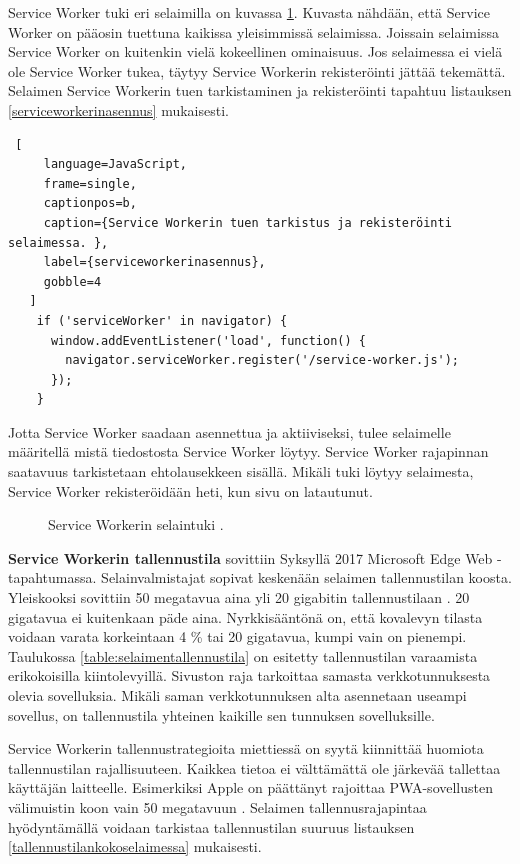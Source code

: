 \documentclass{tktltiki}
\begin{document}
Service Worker tuki eri selaimilla on kuvassa \ref{Service workerin selaintuki}. Kuvasta nähdään, että Service Worker on pääosin tuettuna kaikissa yleisimmissä selaimissa. Joissain selaimissa Service Worker on kuitenkin vielä kokeellinen ominaisuus. Jos selaimessa ei vielä ole Service Worker tukea, täytyy Service Workerin rekisteröinti jättää tekemättä. Selaimen Service Workerin tuen tarkistaminen ja rekisteröinti tapahtuu listauksen \ref{serviceworkerinasennus} mukaisesti.

\begin{lstlisting} [
     language=JavaScript,
     frame=single,
     captionpos=b,
     caption={Service Workerin tuen tarkistus ja rekisteröinti selaimessa. },
     label={serviceworkerinasennus},
     gobble=4
   ]
    if ('serviceWorker' in navigator) {
      window.addEventListener('load', function() {
        navigator.serviceWorker.register('/service-worker.js');
      });
    }
\end{lstlisting}

Jotta Service Worker saadaan asennettua ja aktiiviseksi, tulee selaimelle määritellä mistä tiedostosta Service Worker löytyy. Service Worker rajapinnan saatavuus tarkistetaan ehtolausekkeen sisällä. Mikäli tuki löytyy selaimesta, Service Worker rekisteröidään heti, kun sivu on latautunut. 

\begin{figure}[h]
\begin{center}
\caption{Service Workerin selaintuki \cite{caniuseServiceWorker}. }
\label{Service workerin selaintuki}
\end{center}
\end{figure}


\textbf{Service Workerin tallennustila} sovittiin Syksyllä 2017 Microsoft Edge Web -tapahtumassa. Selainvalmistajat sopivat keskenään selaimen tallennustilan koosta. Yleiskooksi sovittiin 50 megatavua aina yli 20 gigabitin tallennustilaan \cite{Love}. 20 gigatavua ei kuitenkaan päde aina. Nyrkkisääntönä on, että kovalevyn tilasta voidaan varata korkeintaan 4 \% tai 20 gigatavua, kumpi vain on pienempi. Taulukossa \ref{table:selaimentallennustila} on esitetty tallennustilan varaamista erikokoisilla kiintolevyillä. Sivuston raja tarkoittaa samasta verkkotunnuksesta olevia sovelluksia. Mikäli saman verkkotunnuksen alta asennetaan useampi sovellus, on tallennustila yhteinen kaikille sen tunnuksen sovelluksille. 

Service Workerin tallennustrategioita miettiessä on syytä kiinnittää huomiota tallennustilan rajallisuuteen. Kaikkea tietoa ei välttämättä ole järkevää tallettaa käyttäjän laitteelle. Esimerkiksi Apple on päättänyt rajoittaa PWA-sovellusten välimuistin koon vain 50 megatavuun \cite{Love}. Selaimen tallennusrajapintaa hyödyntämällä voidaan tarkistaa tallennustilan suuruus listauksen \ref{tallennustilankokoselaimessa} mukaisesti.
\end{document}
